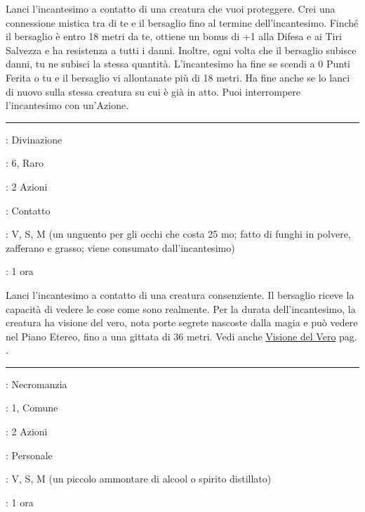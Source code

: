 \begin{multicols}{2}
Lanci l'incantesimo a contatto di una creatura che vuoi proteggere. Crei una connessione mistica tra di te e il bersaglio fino al termine dell'incantesimo. Finché il bersaglio è entro 18 metri da te, ottiene un bonus di +1 alla Difesa e ai Tiri Salvezza e ha resistenza a tutti i danni. Inoltre, ogni volta che il bersaglio subisce danni, tu ne subisci la stessa quantità. L'incantesimo ha fine se scendi a 0 Punti Ferita o tu e il bersaglio vi allontanate più di 18 metri. Ha fine anche se lo lanci di nuovo sulla stessa creatura su cui è già in atto. Puoi interrompere l'incantesimo con un'Azione.

\smallskip\noindent\rule{\linewidth}{2pt} \hypertarget{Visione del Vero}{}\medskip{}
\noindent
\begin{description}[noitemsep, topsep=0pt, parsep=0pt, partopsep=0pt, leftmargin=0cm, labelwidth=2.8cm]
	\item[\textbf{Lista di Magia}]: Divinazione
	\item[\textbf{Livello}]: 6, Raro
	\item[\textbf{T. di Lancio}]: 2 Azioni
	\item[\textbf{Gittata}]: Contatto
	\item[\textbf{Componenti}]: V, S, M (un unguento per gli occhi che costa 25 mo; fatto di funghi in polvere, zafferano e grasso; viene consumato dall'incantesimo)
	\item[\textbf{Durata}]: 1 ora
\end{description}

Lanci l'incantesimo a contatto di una creatura consenziente. Il bersaglio riceve la capacità di vedere le cose come sono realmente. Per la durata dell'incantesimo, la creatura ha visione del vero, nota porte segrete nascoste dalla magia e può vedere nel Piano Etereo, fino a una gittata di 36 metri. Vedi anche \hyperlink{cap Visione del Vero}{Visione del Vero} pag. \pageref{Visione del Vero}.

\smallskip\noindent\rule{\linewidth}{2pt} \hypertarget{Vita Falsata}{}\medskip{}
\noindent
\begin{description}[noitemsep, topsep=0pt, parsep=0pt, partopsep=0pt, leftmargin=0cm, labelwidth=2.8cm]
	\item[\textbf{Lista di Magia}]: Necromanzia
	\item[\textbf{Livello}]: 1, Comune
	\item[\textbf{T. di Lancio}]: 2 Azioni
	\item[\textbf{Gittata}]: Personale
	\item[\textbf{Componenti}]: V, S, M (un piccolo ammontare di alcool o spirito distillato)
	\item[\textbf{Durata}]: 1 ora
\end{description}


\end{multicols}

